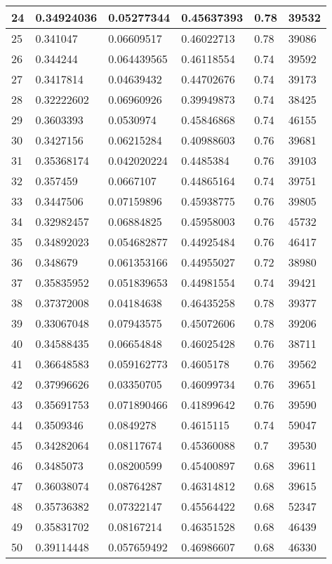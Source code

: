 \begin{longtable}{|l|l|l|l|l|l|}
24 & 0.34924036 & 0.05277344 & 0.45637393 & 0.78 & 39532 \\ \hline 
25 & 0.341047 & 0.06609517 & 0.46022713 & 0.78 & 39086 \\ \hline 
26 & 0.344244 & 0.064439565 & 0.46118554 & 0.74 & 39592 \\ \hline 
27 & 0.3417814 & 0.04639432 & 0.44702676 & 0.74 & 39173 \\ \hline 
28 & 0.32222602 & 0.06960926 & 0.39949873 & 0.74 & 38425 \\ \hline 
29 & 0.3603393 & 0.0530974 & 0.45846868 & 0.74 & 46155 \\ \hline 
30 & 0.3427156 & 0.06215284 & 0.40988603 & 0.76 & 39681 \\ \hline 
31 & 0.35368174 & 0.042020224 & 0.4485384 & 0.76 & 39103 \\ \hline 
32 & 0.357459 & 0.0667107 & 0.44865164 & 0.74 & 39751 \\ \hline 
33 & 0.3447506 & 0.07159896 & 0.45938775 & 0.76 & 39805 \\ \hline 
34 & 0.32982457 & 0.06884825 & 0.45958003 & 0.76 & 45732 \\ \hline 
35 & 0.34892023 & 0.054682877 & 0.44925484 & 0.76 & 46417 \\ \hline 
36 & 0.348679 & 0.061353166 & 0.44955027 & 0.72 & 38980 \\ \hline 
37 & 0.35835952 & 0.051839653 & 0.44981554 & 0.74 & 39421 \\ \hline 
38 & 0.37372008 & 0.04184638 & 0.46435258 & 0.78 & 39377 \\ \hline 
39 & 0.33067048 & 0.07943575 & 0.45072606 & 0.78 & 39206 \\ \hline 
40 & 0.34588435 & 0.06654848 & 0.46025428 & 0.76 & 38711 \\ \hline 
41 & 0.36648583 & 0.059162773 & 0.4605178 & 0.76 & 39562 \\ \hline 
42 & 0.37996626 & 0.03350705 & 0.46099734 & 0.76 & 39651 \\ \hline 
43 & 0.35691753 & 0.071890466 & 0.41899642 & 0.76 & 39590 \\ \hline 
44 & 0.3509346 & 0.0849278 & 0.4615115 & 0.74 & 59047 \\ \hline 
45 & 0.34282064 & 0.08117674 & 0.45360088 & 0.7 & 39530 \\ \hline 
46 & 0.3485073 & 0.08200599 & 0.45400897 & 0.68 & 39611 \\ \hline 
47 & 0.36038074 & 0.08764287 & 0.46314812 & 0.68 & 39615 \\ \hline 
48 & 0.35736382 & 0.07322147 & 0.45564422 & 0.68 & 52347 \\ \hline 
49 & 0.35831702 & 0.08167214 & 0.46351528 & 0.68 & 46439 \\ \hline 
50 & 0.39114448 & 0.057659492 & 0.46986607 & 0.68 & 46330 \\ \hline 
\end{longtable}